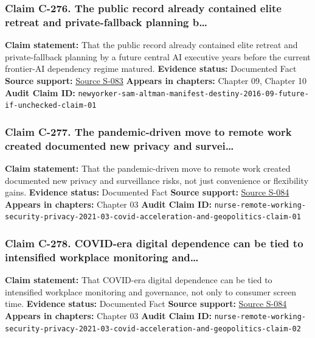 \documentclass[
  american,
  11pt,
  letterpaper,
]{article}
\begin{document}
\subsubsection{Claim C-276. The public record already contained elite
retreat and private-fallback planning
b\ldots{}}\label{claim-c-276-the-public-record-already-contained-elite-retreat-and-private-fallback-planning-b}

\textbf{Claim statement:} That the public record already contained elite
retreat and private-fallback planning by a future central AI executive
years before the current frontier-AI dependency regime matured.
\textbf{Evidence status:} Documented Fact \textbf{Source support:}
\hyperref[source-s-083-sam-altman-s-manifest-destiny]{Source S-083}
\textbf{Appears in chapters:} Chapter 09, Chapter 10 \textbf{Audit Claim
ID:}
\texttt{newyorker-sam-altman-manifest-destiny-2016-09-future-if-unchecked-claim-01}

\subsubsection{Claim C-277. The pandemic-driven move to remote work
created documented new privacy and
survei\ldots{}}\label{claim-c-277-the-pandemic-driven-move-to-remote-work-created-documented-new-privacy-and-survei}

\textbf{Claim statement:} That the pandemic-driven move to remote work
created documented new privacy and surveillance risks, not just
convenience or flexibility gains. \textbf{Evidence status:} Documented
Fact \textbf{Source support:}
\hyperref[source-s-084-remote-working-pre-and-post-covid-19-an-analysis-of-new-threats-and-risks-to-security-and-privacy]{Source
S-084} \textbf{Appears in chapters:} Chapter 03 \textbf{Audit Claim ID:}
\texttt{nurse-remote-working-security-privacy-2021-03-covid-acceleration-and-geopolitics-claim-01}

\subsubsection{Claim C-278. COVID-era digital dependence can be tied to
intensified workplace monitoring
and\ldots{}}\label{claim-c-278-covid-era-digital-dependence-can-be-tied-to-intensified-workplace-monitoring-and}

\textbf{Claim statement:} That COVID-era digital dependence can be tied
to intensified workplace monitoring and governance, not only to consumer
screen time. \textbf{Evidence status:} Documented Fact \textbf{Source
support:}
\hyperref[source-s-084-remote-working-pre-and-post-covid-19-an-analysis-of-new-threats-and-risks-to-security-and-privacy]{Source
S-084} \textbf{Appears in chapters:} Chapter 03 \textbf{Audit Claim ID:}
\texttt{nurse-remote-working-security-privacy-2021-03-covid-acceleration-and-geopolitics-claim-02}
\end{document}
